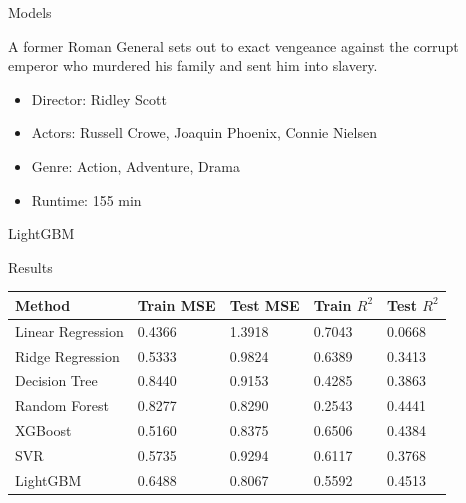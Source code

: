 \documentclass[final]{beamer}
\newlength{\onecolwid}
\begin{document}
\begin{frame}[t]
\begin{columns}[t]
\begin{column}{\onecolwid}
\begin{block}{Models}
\begin{itemize}
\begin{minipage}{0.3\textwidth}
\end{minipage} \hfill
\begin{minipage}{0.3\textwidth}
\begin{tcolorbox}
A former Roman General sets out to exact vengeance against the corrupt emperor who murdered his family and sent him into slavery.
\end{tcolorbox}
\end{minipage} \hfill
\begin{minipage}{0.3\textwidth}
\begin{tcolorbox}
\begin{itemize}
\item Director: Ridley Scott
\item Actors:  Russell Crowe, Joaquin Phoenix, Connie Nielsen
\item Genre:  Action, Adventure, Drama 
\item Runtime: 155 min
\end{itemize}
\end{tcolorbox}
\end{minipage} \hfill

\begin{tcolorbox}
\centering
LightGBM
\end{tcolorbox}

\end{itemize}
\end{block}

\begin{block}{Results}

\begin{table}
  \centering
  \begin{tabular}{lllll}
    \toprule
    Method & Train MSE & Test MSE & Train $R^2$ & Test $R^2$  \\
    \midrule
    Linear Regression & 0.4366 & 1.3918 & 0.7043 & 0.0668   \\
    Ridge Regression & 0.5333 & 0.9824 & 0.6389 & 0.3413   \\
    Decision Tree & 0.8440 & 0.9153 & 0.4285 & 0.3863   \\
    Random Forest & 0.8277 & 0.8290 & 0.2543 & 0.4441   \\
    XGBoost & 0.5160 & 0.8375 & 0.6506 & 0.4384 \\
    SVR & 0.5735 & 0.9294 & 0.6117 & 0.3768 \\
    LightGBM & 0.6488 & 0.8067 & 0.5592 & 0.4513 \\
        \bottomrule
  \end{tabular}
\end{table}


\end{block}
\end{column}
\end{columns}
\end{frame}
\end{document}
